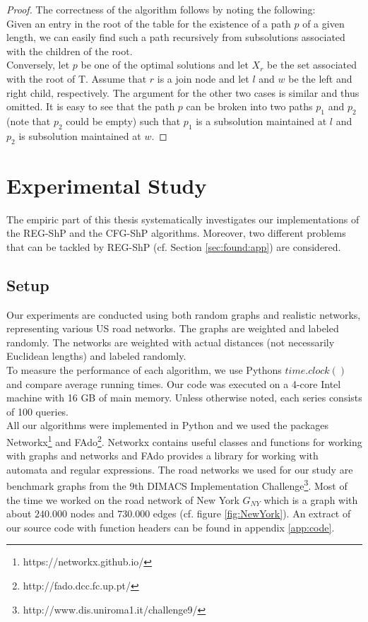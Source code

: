 \documentclass[]{article}
\numberwithin{equation}{section}
\begin{document}
\begin{proof}
	The correctness of the algorithm follows by noting the following:\\
	
	Given an entry in the root of the table for the existence of a path $p$ of a given length, we can easily find such a path recursively from subsolutions associated with the children of the root.\\
	
	Conversely, let $p$ be one of the optimal solutions and let $X_r$ be the set associated with the root of T. Assume that $r$ is a join node and let $l$ and $w$ be the left and right child, respectively. The argument for the other two cases is similar and thus omitted. It is easy to see that the path $p$ can be broken into two paths $p_1$ and $p_2$ (note that $p_2$ could be empty) such that $p_1$ is a subsolution maintained at $l$ and $p_2$ is subsolution maintained at $w$.
\end{proof}
\newpage

\section{Experimental Study}
\label{sec:study}

The empiric part of this thesis systematically investigates our implementations of the REG-ShP and the CFG-ShP algorithms. Moreover, two different problems that can be tackled by REG-ShP (cf. Section \ref{sec:found:app}) are considered.

\subsection{Setup}
\label{sec:study:setup}

Our experiments are conducted using both random graphs and realistic networks, representing various US road networks. The graphs are weighted and labeled randomly. The networks are weighted with actual distances (not necessarily Euclidean lengths) and labeled randomly.\\

To measure the performance of each algorithm, we use Pythons $time.clock()$ and compare average running times. Our code was executed on a 4-core Intel machine with 16 GB of main memory. Unless otherwise noted, each series consists of 100 queries.\\

All our algorithms were implemented in Python and we used the packages Networkx\footnote{https://networkx.github.io/} and FAdo\footnote{http://fado.dcc.fc.up.pt/}. Networkx contains useful classes and functions for working with graphs and networks and FAdo provides a library for working with automata and regular expressions. The road networks we used for our study are benchmark graphs from the 9th DIMACS Implementation Challenge\footnote{http://www.dis.uniroma1.it/challenge9/}. Most of the time we worked on the road network of New York $G_{NY}$ which is a graph with about $240.000$ nodes and $730.000$ edges (cf. figure \ref{fig:NewYork}). An extract of our source code with function headers can be found in appendix \ref{app:code}.
\end{document}

